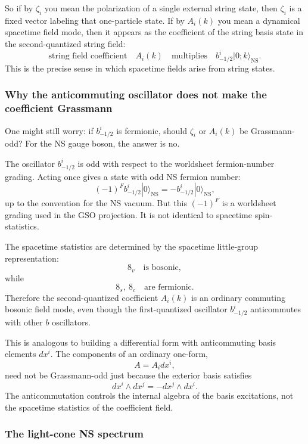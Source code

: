 \documentclass[
  10pt,
  a4paper,
  openany]{book}
\begin{document}
So if by \(\zeta_i\) you mean the polarization of a single external
string state, then \(\zeta_i\) is a fixed vector labeling that
one-particle state. If by \(A_i(k)\) you mean a dynamical spacetime
field mode, then it appears as the coefficient of the string basis state
in the second-quantized string field: \[
\text{string field coefficient}
\quad
A_i(k)
\quad
\text{multiplies}
\quad
b_{-1/2}^i|0;k\rangle_{\text{NS}}.
\] This is the precise sense in which spacetime fields arise from string
states.

\subsubsection{Why the anticommuting oscillator does not make the
coefficient
Grassmann}\label{why-the-anticommuting-oscillator-does-not-make-the-coefficient-grassmann}

One might still worry: if \(b_{-1/2}^i\) is fermionic, should
\(\zeta_i\) or \(A_i(k)\) be Grassmann-odd? For the NS gauge boson, the
answer is no.

The oscillator \(b_{-1/2}^i\) is odd with respect to the worldsheet
fermion-number grading. Acting once gives a state with odd NS fermion
number: \[
(-1)^F b_{-1/2}^i|0\rangle_{\text{NS}}
=
-
b_{-1/2}^i|0\rangle_{\text{NS}},
\] up to the convention for the NS vacuum. But this \((-1)^F\) is a
worldsheet grading used in the GSO projection. It is not identical to
spacetime spin-statistics.

The spacetime statistics are determined by the spacetime little-group
representation: \[
8_v
\quad
\text{is bosonic},
\] while \[
8_s,\ 8_c
\quad
\text{are fermionic}.
\] Therefore the second-quantized coefficient \(A_i(k)\) is an ordinary
commuting bosonic field mode, even though the first-quantized oscillator
\(b_{-1/2}^i\) anticommutes with other \(b\) oscillators.

This is analogous to building a differential form with anticommuting
basis elements \(dx^i\). The components of an ordinary one-form, \[
A=A_i dx^i,
\] need not be Grassmann-odd just because the exterior basis satisfies
\[
dx^i\wedge dx^j=-dx^j\wedge dx^i.
\] The anticommutation controls the internal algebra of the basis
excitations, not the spacetime statistics of the coefficient field.

\subsubsection{The light-cone NS
spectrum}\label{the-light-cone-ns-spectrum}
\end{document}
